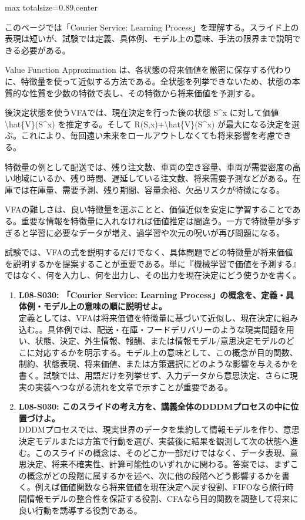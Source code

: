 \begin{minipage}[t]{0.58\textwidth}
\begin{adjustbox}{max totalsize={\textwidth}{0.89\textheight},center}
\begin{minipage}{\textwidth}\scriptsize
{}このページでは「Courier Service: Learning Process」を理解する。スライド上の表現は短いが、試験では定義、具体例、モデル上の意味、手法の限界まで説明できる必要がある。\par
Value Function Approximation は、各状態の将来価値を厳密に保存する代わりに、特徴量を使って近似する方法である。全状態を列挙できないため、状態の本質的な性質を少数の特徴で表し、その特徴から将来価値を予測する。\par
後決定状態を使うVFAでは、現在決定を行った後の状態 S\textasciicircum{}x に対して価値 \textbackslash{}hat\{V\}(S\textasciicircum{}x) を推定する。そして R(S,x)+\textbackslash{}hat\{V\}(S\textasciicircum{}x) が最大になる決定を選ぶ。これにより、毎回遠い未来をロールアウトしなくても将来影響を考慮できる。\par
特徴量の例として配送では、残り注文数、車両の空き容量、車両が需要密度の高い地域にいるか、残り時間、遅延している注文数、将来需要予測などがある。在庫では在庫量、需要予測、残り期間、容量余裕、欠品リスクが特徴になる。\par
VFAの難しさは、良い特徴量を選ぶことと、価値近似を安定に学習することである。重要な情報を特徴量に入れなければ価値推定は間違う。一方で特徴量が多すぎると学習に必要なデータが増え、過学習や次元の呪いが再び問題になる。\par
試験では、VFAの式を説明するだけでなく、具体問題でどの特徴量が将来価値を説明するかを提案することが重要である。単に『機械学習で価値を予測する』ではなく、何を入力し、何を出力し、その出力を現在決定にどう使うかを書く。\par{}\begin{enumerate}\item \textbf{L08-S030: 「Courier Service: Learning Process」の概念を、定義・具体例・モデル上の意味の順に説明せよ。}\\定義としては、VFAは将来価値を特徴量に基づいて近似し、現在決定に組み込む。。具体例では、配送・在庫・フードデリバリーのような現実問題を用い、状態、決定、外生情報、報酬、または情報モデル/意思決定モデルのどこに対応するかを明示する。モデル上の意味として、この概念が目的関数、制約、状態表現、将来価値、または方策選択にどのような影響を与えるかを書く。試験では、用語だけを列挙せず、入力データから意思決定、さらに現実の実装へつながる流れを文章で示すことが重要である。\item \textbf{L08-S030: このスライドの考え方を、講義全体のDDDMプロセスの中に位置づけよ。}\\DDDMプロセスでは、現実世界のデータを集約して情報モデルを作り、意思決定モデルまたは方策で行動を選び、実装後に結果を観測して次の状態へ進む。このスライドの概念は、そのどこか一部だけではなく、データ表現、意思決定、将来不確実性、計算可能性のいずれかに関わる。答案では、まずこの概念がどの段階に属するかを述べ、次に他の段階へどう影響するかを書く。例えば価値関数なら将来価値を現在決定へ戻す役割、FIFOなら旅行時間情報モデルの整合性を保証する役割、CFAなら目的関数を調整して将来に良い行動を誘導する役割である。\end{enumerate}

\end{minipage}
\end{adjustbox}
\end{minipage}
